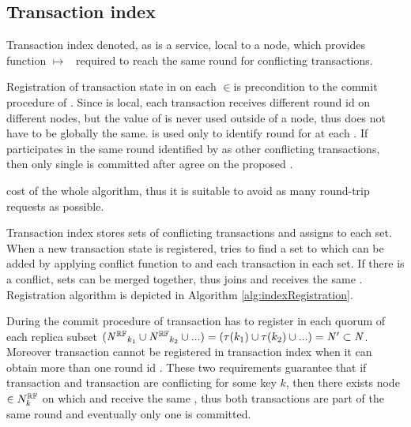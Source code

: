 
\subsection{Transaction index}
\label{sec:mpp:txIndex}
Transaction index denoted, as \txIndex is a service, local to a node, which provides function \mbox{\txState $\mapsto $ \paxosRoundId} required to reach the same \paxos round for conflicting transactions.

Registration of transaction state \txState in \txIndex on each  $\in$\nodesTx is precondition to the commit procedure of \mpt. 
Since \txIndex is local, each transaction \transaction receives different \paxos round id \paxosRoundId on different nodes, but the value of \paxosRoundId is never used outside of a node, thus \paxosRoundId does not have to be globally the same. \paxosRoundId is used only to identify \paxos round for \conflictingTxSet at each . If \transaction participates in the same \paxos round identified by \paxosRoundId as other conflicting transactions, then only single \transaction is committed after \nodesTx agree on the proposed \txState.

cost of the whole algorithm, thus it is suitable to avoid as many round-trip requests as possible.


Transaction index stores sets of conflicting transactions \conflictingTxSet and assigns \paxosRoundId to each set. When a new transaction state \txStateM is registered, \txIndex tries to find a set \conflictingTxSet to which \txStateM can be added by applying conflict function \conflictFunction to \txStateM and each transaction \transaction in each set. If there is a conflict, sets can be merged together, thus \txStateM joins \conflictingTxSet and receives the same \paxosRoundId. Registration algorithm is depicted in Algorithm \ref{alg:indexRegistration}.

During the commit procedure of \mpt transaction \transactionFull has to register in each quorum of each replica subset
$(\mathit{N^{\mathbb{RF}}}_{k_1} \cup \mathit{N^{\mathbb{RF}}}_{k_2} \cup ... ) =
(\tau(k_1) \cup \tau(k_2) \cup ... ) = 
 \text{$\mathit{N'}$}\subset\mathit{N}$.
Moreover transaction \transaction cannot be registered in transaction index \txIndex when it can obtain more than one \paxos round id \paxosRoundId. These two requirements guarantee that if transaction \txOne and transaction \txTwo are conflicting for some key $k$, then there exists node 
$\in N^{\mathbb{RF}}_{k}$ on which \txOne and \txTwo receive the same \paxosRoundId, thus both transactions are part of the same \paxos round and eventually only one is committed.

